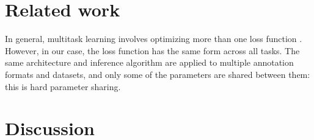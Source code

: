\documentclass[11pt,a4paper]{article}
\begin{document}
\section{Related work}\label{sec:related_work}

In general, multitask learning involves optimizing more than one loss function \cite{ruder2017overview}.
However, in our case, the loss function has the same form across all tasks.
The same architecture and inference algorithm are applied to multiple annotation formats and datasets,
and only some of the parameters are shared between them: this is hard parameter sharing.



\section{Discussion}\label{sec:discussion}





\end{document}
